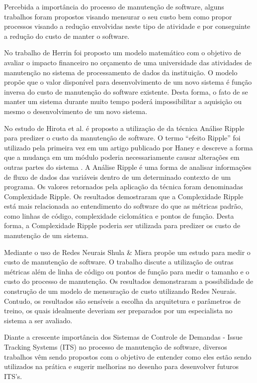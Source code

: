 \documentclass[msc,proposal,hidelot,hideabstract]{ppgccufmg} %
\begin{document}
Percebida a importância do processo de manutenção de software, alguns trabalhos foram propostos visando mensurar o seu custo bem como propor
processos visando a redução envolvidas neste tipo de atividade e por
conseguinte a redução do custo de manter o software.

No trabalho de Herrin \cite{Herrin:1985:SMC:323287.323383} foi proposto um modelo matemático com o
objetivo de avaliar o impacto financeiro no orçamento de uma universidade das atividades de manutenção no sistema
de processamento de dados da instituição. O modelo propõe que o valor disponível para desenvolvimento de um novo sistema é
função inversa do custo de manutenção do software existente. Desta forma, o
fato de se manter um sistema durante muito tempo poderá impossibilitar a
aquisição ou mesmo o desenvolvimento de um novo sistema.

No estudo de Hirota et al. \cite{hirota1994approach} é proposto a utilização de
da técnica Análise Ripple para predizer o custo da manutenção de software. O
termo ``efeito Ripple'' foi utilizado pela primeira vez em um artigo publicado
por Haney \cite{haney1972module} e descreve a forma que a mudança em um módulo poderia
necessariamente causar alterações em outras partes do sistema
\cite{bilal2005using}. A Análise Ripple é uma forma de analisar informações de fluxo de dados das variáveis
dentro de um determinado contexto de um programa. Os valores retornados pela
aplicação da técnica foram denominadas Complexidade Ripple. Os resultados
demostraram que a Complexidade Ripple está mais relacionada ao entendimento do
software do que as métricas padrão, como linhas de código, complexidade
ciclomática e pontos de função. Desta forma, a Complexidade Ripple poderia ser
utilizada para predizer os custo de manutenção de um sistema.

Mediante o uso de Redes Neurais Shula \& Misra
\cite{Shukla:2008:ESM:1342211.1342232} propõe um estudo para medir o custo de
manutenção de software. O trabalho discute a utilização de outras métricas além
de linha de código ou pontos de função para medir o tamanho e o custo do
processo de manutenção. Os resultados demonstraram a possibilidade de
construção de um modelo de mensuração de custo utilizando Redes
Neurais. Contudo, os resultados são sensíveis a escolha da arquitetura e
parâmetros de treino, os quais idealmente deveriam ser preparados por um
especialista no sistema a ser avaliado.

Diante a crescente importância dos Sistemas de Controle de Demandas -
Issue Tracking Systems (ITS) no processo de manutenção de software, diversos
trabalhos vêm sendo propostos com o objetivo de entender como eles estão sendo
utilizados na prática e sugerir melhorias no desenho para desenvolver futuros
ITS's.
\end{document}
